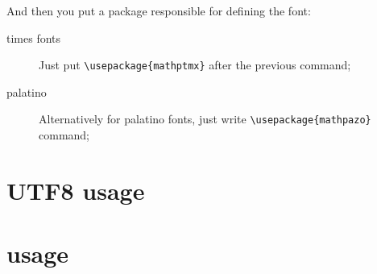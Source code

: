 And then you put a package responsible for defining the font:
\begin{description}
    \item[times fonts] Just put \verb|\usepackage{mathptmx}| after the previous
        command;
    \item[palatino] Alternatively for palatino fonts, just write
        \verb|\usepackage{mathpazo}| command;
\end{description}

\section{UTF8 usage}

\section{\XeTeX{} usage}





